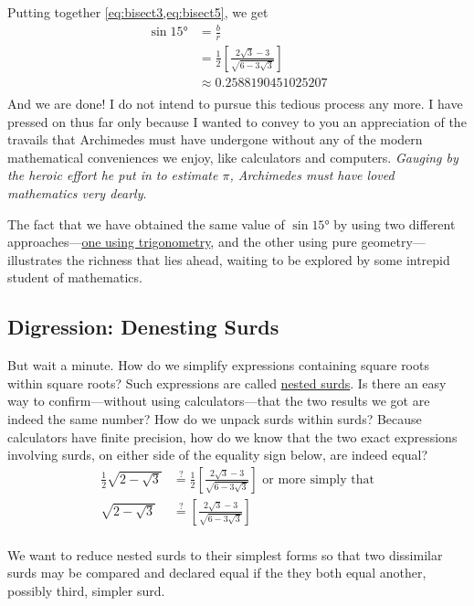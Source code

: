 \documentclass[
  a4paper,
]{article}
\begin{document}
Putting together \cref{eq:bisect3,eq:bisect5}, we get \[
\begin{aligned}
\sin 15° &= \frac{b}{r}\\
&= \frac{1}{2}\left[\frac{2\sqrt{3} - 3}{\sqrt{6 - 3\sqrt{3}}}\right]\\[1em]
&\approx 0.2588190451025207\\
\end{aligned}
\] And we are done! I do not intend to pursue this tedious process any
more. I have pressed on thus far only because I wanted to convey to you
an appreciation of the travails that Archimedes must have undergone
without any of the modern mathematical conveniences we enjoy, like
calculators and computers. \emph{Gauging by the heroic effort he put in
to estimate \(\pi\), Archimedes must have loved mathematics very
dearly}.

The fact that we have obtained the same value of \(\sin 15°\) by using
two different approaches---\hyperref[the-half-angle-formulae]{one using
trigonometry}, and the other using pure geometry--- illustrates the
richness that lies ahead, waiting to be explored by some intrepid
student of mathematics.

\subsection{Digression: Denesting
Surds}\label{digression-denesting-surds}

But wait a minute. How do we simplify expressions containing square
roots within square roots? Such expressions are called
\href{https://undergroundmathematics.org/thinking-about-algebra/nested-surds/solution}{nested
surds}. Is there an easy way to confirm---without using
calculators---that the two results we got are indeed the same number?
How do we unpack surds within surds? Because calculators have finite
precision, how do we know that the two exact expressions involving
surds, on either side of the equality sign below, are indeed equal? \[
\begin{aligned}
\frac{1}{2}\sqrt{2 - \sqrt{3}} &\overset{?}{=} \frac{1}{2}\left[\frac{2\sqrt{3} - 3}{\sqrt{6 - 3\sqrt{3}}}\right]\mbox{ or more simply that}\\
\sqrt{2 - \sqrt{3}}&\overset{?}{=} \left[\frac{2\sqrt{3} - 3}{\sqrt{6 - 3\sqrt{3}}}\right]\\
\end{aligned}
\]

We want to reduce nested surds to their simplest forms so that two
dissimilar surds may be compared and declared equal if the they both
equal another, possibly third, simpler surd.
\end{document}
